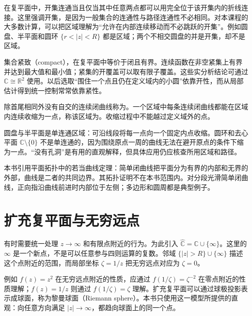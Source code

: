 \documentclass[UTF8,12pt,a4paper,fontset=fandol]{ctexbook}
\begin{document}
在复平面中，开集连通当且仅当其中任意两点都可以用完全位于该开集内的折线连接。这里强调开集，是因为一般集合的连通性与路径连通性不必相同。对本课程的大多数计算，可以把区域理解为“允许在内部连续移动而不必跳跃的开集”。例如圆盘、半平面和圆环 $\{r<|z|<R\}$ 都是区域；两个不相交圆盘的并是开集，却不是区域。

集合紧致（compact），在复平面中等价于闭且有界。连续函数在非空紧集上有界并达到最大值和最小值；紧集的开覆盖可以取有限子覆盖。这些实分析结论可通过 $\mathbb C\cong\mathbb R^2$ 使用。以后选取“围住一个点且仍在定义域内的小圆”依靠开性，而从局部估计得到统一控制常常依靠紧性。

\begin{definition}[简单闭曲线与单连通区域]
除首尾相同外没有自交的连续闭曲线称为。一个区域中每条连续闭曲线都能在区域内连续收缩为一点，称该区域为。收缩过程中不能越过定义域外的点。
\end{definition}

圆盘与半平面是单连通区域：可沿线段将每一点向一个固定内点收缩。圆环和去心平面 $\mathbb C\setminus\{0\}$ 不是单连通的，因为围绕原点一周的曲线无法在避开原点的条件下缩为一点。“没有孔洞”是有用的直观解释，但具体应用仍应核查所用区域和路径。

本书引用平面拓扑中的若当曲线定理：简单闭曲线把平面分为有界的内部和无界的外部，曲线是二者的共同边界。其拓扑证明不在本书范围内。对分段光滑简单闭曲线，正向指沿曲线前进时内部位于左侧；多边形和圆周都是典型例子。

\section{扩充复平面与无穷远点}

有时需要统一处理 $z\to\infty$ 和有限点附近的行为。为此引入 $\widehat{\mathbb C}=\mathbb C\cup\{\infty\}$。这里的 $\infty$ 是一个新点，不是可以任意参与四则运算的复数。邻域 $\{|z|>R\}\cup\{\infty\}$ 描述这个点附近的范围，而局部坐标 $\zeta=1/z$ 把无穷远点对应为 $\zeta=0$。

例如 $f(z)=z^2$ 在无穷远点附近的性质，应通过 $f(1/\zeta)=\zeta^{-2}$ 在零点附近的性质理解；$f(z)=1/z$ 则通过 $f(1/\zeta)=\zeta$ 理解。扩充复平面可以通过球极投影表示成球面，称为黎曼球面（Riemann sphere）。本书只使用这一模型所提供的直观：向任意方向满足 $|z|\to\infty$，都趋向球面上的同一个点。
\end{document}
